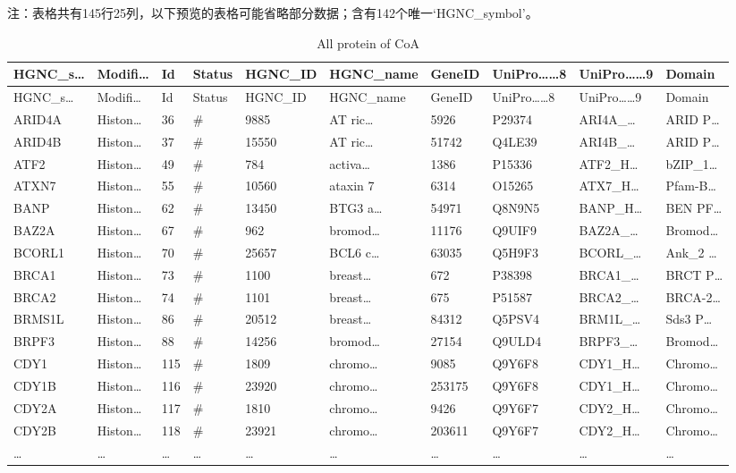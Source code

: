 \documentclass[
]{article}
\begin{document}
\begin{center}\begin{tcolorbox}[colback=gray!10, colframe=gray!50, width=0.9\linewidth, arc=1mm, boxrule=0.5pt]注：表格共有145行25列，以下预览的表格可能省略部分数据；含有142个唯一`HGNC\_symbol'。
\end{tcolorbox}
\end{center}

\begin{longtable}[]{@{}llllllllll@{}}
\caption{\label{tab:All-protein-of-CoA}All protein of CoA}\tabularnewline
\toprule
HGNC\_s\ldots{} & Modifi\ldots{} & Id & Status & HGNC\_ID & HGNC\_name & GeneID & UniPro\ldots\ldots8 & UniPro\ldots\ldots9 & Domain\tabularnewline
\midrule
\endfirsthead
\toprule
HGNC\_s\ldots{} & Modifi\ldots{} & Id & Status & HGNC\_ID & HGNC\_name & GeneID & UniPro\ldots\ldots8 & UniPro\ldots\ldots9 & Domain\tabularnewline
\midrule
\endhead
ARID4A & Histon\ldots{} & 36 & \# & 9885 & AT ric\ldots{} & 5926 & P29374 & ARI4A\_\ldots{} & ARID P\ldots{}\tabularnewline
ARID4B & Histon\ldots{} & 37 & \# & 15550 & AT ric\ldots{} & 51742 & Q4LE39 & ARI4B\_\ldots{} & ARID P\ldots{}\tabularnewline
ATF2 & Histon\ldots{} & 49 & \# & 784 & activa\ldots{} & 1386 & P15336 & ATF2\_H\ldots{} & bZIP\_1\ldots{}\tabularnewline
ATXN7 & Histon\ldots{} & 55 & \# & 10560 & ataxin 7 & 6314 & O15265 & ATX7\_H\ldots{} & Pfam-B\ldots{}\tabularnewline
BANP & Histon\ldots{} & 62 & \# & 13450 & BTG3 a\ldots{} & 54971 & Q8N9N5 & BANP\_H\ldots{} & BEN PF\ldots{}\tabularnewline
BAZ2A & Histon\ldots{} & 67 & \# & 962 & bromod\ldots{} & 11176 & Q9UIF9 & BAZ2A\_\ldots{} & Bromod\ldots{}\tabularnewline
BCORL1 & Histon\ldots{} & 70 & \# & 25657 & BCL6 c\ldots{} & 63035 & Q5H9F3 & BCORL\_\ldots{} & Ank\_2 \ldots{}\tabularnewline
BRCA1 & Histon\ldots{} & 73 & \# & 1100 & breast\ldots{} & 672 & P38398 & BRCA1\_\ldots{} & BRCT P\ldots{}\tabularnewline
BRCA2 & Histon\ldots{} & 74 & \# & 1101 & breast\ldots{} & 675 & P51587 & BRCA2\_\ldots{} & BRCA-2\ldots{}\tabularnewline
BRMS1L & Histon\ldots{} & 86 & \# & 20512 & breast\ldots{} & 84312 & Q5PSV4 & BRM1L\_\ldots{} & Sds3 P\ldots{}\tabularnewline
BRPF3 & Histon\ldots{} & 88 & \# & 14256 & bromod\ldots{} & 27154 & Q9ULD4 & BRPF3\_\ldots{} & Bromod\ldots{}\tabularnewline
CDY1 & Histon\ldots{} & 115 & \# & 1809 & chromo\ldots{} & 9085 & Q9Y6F8 & CDY1\_H\ldots{} & Chromo\ldots{}\tabularnewline
CDY1B & Histon\ldots{} & 116 & \# & 23920 & chromo\ldots{} & 253175 & Q9Y6F8 & CDY1\_H\ldots{} & Chromo\ldots{}\tabularnewline
CDY2A & Histon\ldots{} & 117 & \# & 1810 & chromo\ldots{} & 9426 & Q9Y6F7 & CDY2\_H\ldots{} & Chromo\ldots{}\tabularnewline
CDY2B & Histon\ldots{} & 118 & \# & 23921 & chromo\ldots{} & 203611 & Q9Y6F7 & CDY2\_H\ldots{} & Chromo\ldots{}\tabularnewline
\ldots{} & \ldots{} & \ldots{} & \ldots{} & \ldots{} & \ldots{} & \ldots{} & \ldots{} & \ldots{} & \ldots{}\tabularnewline
\bottomrule
\end{longtable}
\end{document}

